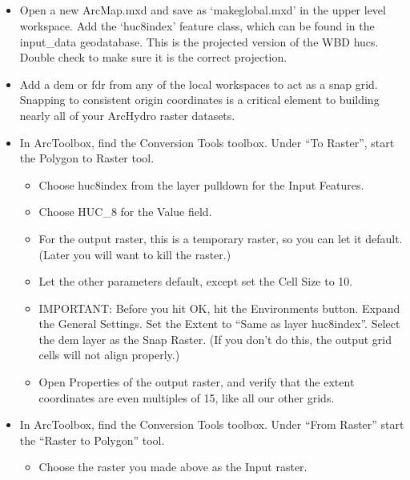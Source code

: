 \documentclass[letterpaper,10pt,english]{sphinxmanual}
\begin{document}
\subparagraph{}
\label{\detokenize{ex_2:huc8index-method-old-way}}\begin{itemize}
\item {} 
Open a new ArcMap.mxd and save as ‘makeglobal.mxd’ in the upper level workspace.  Add the ‘huc8index’ feature class, which can be found in the input\_data geodatabase. This is the projected version of the WBD hucs. Double check to make sure it is the correct projection.

\item {} 
Add a dem or fdr from any of the local workspaces to act as a snap grid.  Snapping to consistent origin coordinates is a critical element to building nearly all of your ArcHydro raster datasets.

\item {} 
In ArcToolbox, find the Conversion Tools toolbox. Under “To Raster”, start the Polygon to Raster tool.
\begin{itemize}
\item {} 
Choose huc8index from the layer pulldown for the Input Features.

\item {} 
Choose HUC\_8 for the Value field.

\item {} 
For the output raster, this is a temporary raster, so you can let it default. (Later you will want to kill the raster.)

\item {} 
Let the other parameters default, except set the Cell Size to 10.

\item {} 
IMPORTANT: Before you hit OK, hit the Environments button. Expand the General Settings. Set the Extent to “Same as layer huc8index”. Select the dem layer as the Snap Raster. (If you don’t do this, the output grid cells will not align properly.)

\item {} 
Open Properties of the output raster, and verify that the extent coordinates are even multiples of 15, like all our other grids.

\end{itemize}

\item {} 
In ArcToolbox, find the Conversion Tools toolbox. Under “From Raster” start the “Raster to Polygon” tool.
\begin{itemize}
\item {} 
Choose the raster you made above as the Input raster.


\end{itemize}
\end{itemize}
\end{document}
